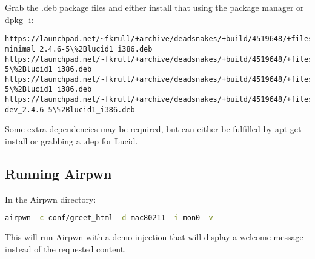Grab the .deb package files and either install that using the package manager or dpkg -i:
\begin{verbatim}
https://launchpad.net/~fkrull/+archive/deadsnakes/+build/4519648/+files/python2.4-minimal_2.4.6-5\%2Blucid1_i386.deb
https://launchpad.net/~fkrull/+archive/deadsnakes/+build/4519648/+files/python2.4_2.4.6-5\%2Blucid1_i386.deb
https://launchpad.net/~fkrull/+archive/deadsnakes/+build/4519648/+files/libpython2.4_2.4.6-5\%2Blucid1_i386.deb
https://launchpad.net/~fkrull/+archive/deadsnakes/+build/4519648/+files/python2.4-dev_2.4.6-5\%2Blucid1_i386.deb
\end{verbatim}
Some extra dependencies may be required, but can either be fulfilled by apt-get install or grabbing a .dep for Lucid.


\subsection*{Running Airpwn}
In the Airpwn directory:
\begin{lstlisting}[language=bash]
airpwn -c conf/greet_html -d mac80211 -i mon0 -v
\end{lstlisting}
This will run Airpwn with a demo injection that will display a welcome message instead of the requested content.
